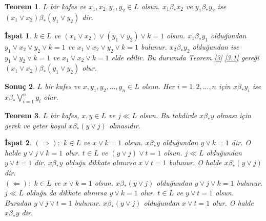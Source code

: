 \documentclass[a4paper,12pt]{article}
\numberwithin{equation}{section}
\theoremstyle{italik}
\newtheorem{teorem}{Teorem}[section]
\newtheorem{sonuc}[teorem]{Sonuç}
\newtheorem*{ispat}{İspat}
\begin{document}



\begin{teorem}\label{18}
  $ L $ bir kafes ve $ x_1, x_2,y_1,y_2 \in L $ olsun. $ x_1 \beta_* x_2 $ ve $ y_1 \beta_* y_2 $ ise 
  $ ( x_1 \vee x_2 ) \beta_* ( y_1 \vee y_2 ) $ dir.
\end{teorem}
\begin{ispat}
  $ k \in L $ ve $ ( x_1 \vee x_2 ) \vee ( y_1 \vee y_2 ) \vee k = 1 $ olsun. 
  $ x_1 \beta_* y_1 $ olduğundan $ y_1 \vee x_2 \vee y_2 \vee k =1 $ ve $ x_1 \vee x_2 \vee y_2 \vee k = 1 $ bulunur. 
  $ x_2 \beta_* y_2 $ olduğundan ise $ y_1 \vee y_2 \vee k = 1 $ ve $ x_1 \vee x_2 \vee k = 1 $ elde edilir. 
  Bu durumda Teorem \ref{3} \ref{3.1} gereği $ ( x_1 \vee x_2 ) \beta_* ( y_1 \vee y_2 ) $ olur.
\end{ispat}






\begin{sonuc} \label{19}
  $ L $ bir kafes ve $ x,y_1,y_2,...,y_n \in L $ olsun. Her $ i=1,2,...,n $ için $ x \beta_* y_i $ ise 
  $ \displaystyle x \beta_* \bigvee_{i=1}^n y_i $ olur.
\end{sonuc}

 

            
 
\begin{teorem} \label{21}
  $ L $ bir kafes, $ x,y \in L $ ve $ j \ll L $ olsun. 
  Bu takdirde $ x \beta_* y $ olması için gerek ve yeter koşul $ x \beta_* ( y \vee j ) $ olmasıdır. 
\end{teorem}
\begin{ispat}
  $ ( \Rightarrow ): $ 
  $ k \in L $ ve $ x \vee k = 1 $ olsun. $ x \beta_* y $ olduğundan $ y \vee k = 1 $ dir. O halde 
  $ y \vee j \vee k = 1 $ olur.
  $ t \in L $ ve $ ( y \vee j ) \vee t = 1 $ olsun. $ j \ll L $ olduğundan $ y \vee t = 1 $ dir. 
  $ x \beta_* y $ olduğu dikkate alınırsa $ x \vee t = 1 $ bulunur. O halde $ x \beta_* ( y \vee j ) $ dir. \\
  $ ( \Leftarrow ): $ $ k \in L $ ve $ x \vee k = 1 $ olsun. $ x \beta_* ( y \vee j ) $ olduğundan 
  $ y \vee j \vee k = 1 $ bulunur. $ j \ll L $ olduğu da dikkate alınırsa $ y \vee k = 1 $ olur. 
  $ t \in L $ ve $ y \vee t = 1 $ olsun. Buradan $ y \vee j \vee t = 1 $ bulunur. $ x \beta_* ( y \vee j ) $ 
  olduğundan $ x \vee t = 1 $ olur. O halde $ x \beta_* y $ dir.
\end{ispat}
 
\end{document}
